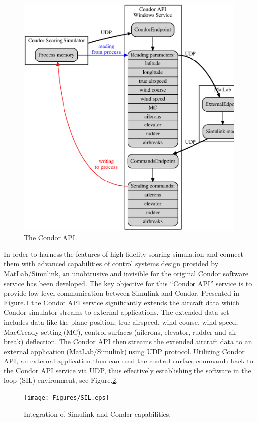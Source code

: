 \documentclass[letterpaper, 10 pt, conference]{ieeeconf}  %
\begin{document}
\begin{figure}[thpb]
  \centering
  \includegraphics[scale=0.4]{Figures/api_arch.eps}
  \caption{The Condor API.}
  \label{fig:api_arch}
\end{figure}

In order to harness the features of high-fidelity soaring simulation and
connect them with advanced capabilities of control systems design provided by
MatLab/Simulink, an unobtrusive and invisible for the original Condor
software service has been developed. The key objective for this ``Condor
API'' service is to provide low-level communication between Simulink and
Condor. Presented in Figure.\ref{fig:api_arch} the Condor API service
significantly extends the aircraft data which Condor simulator streams to
external applications. The extended data set includes data like the plane
position, true airspeed, wind course, wind speed, MacCready setting (MC),
control surfaces (ailerons, elevator, rudder and air-break) deflection. The
Condor API then streams the extended aircraft data to an external application
(MatLab/Simulink) using UDP protocol. Utilizing Condor API, an external
application then can send the control surface commands back to the Condor API
service via UDP, thus effectively establishing the software in the loop (SIL)
environment, see Figure.\ref{fig:SIL}.
\begin{figure}[thpb]
  \centering
  \texttt{[image: Figures/SIL.eps]}
  \caption{Integration of Simulink and Condor capabilities.}
  \label{fig:SIL}
\end{figure}
\end{document}
